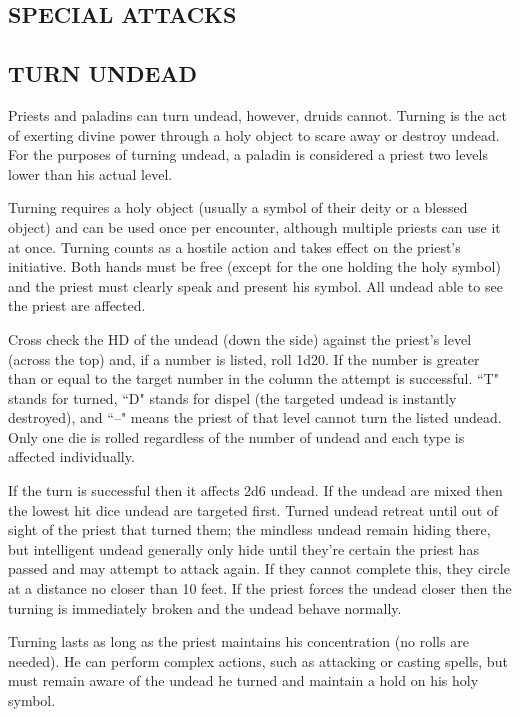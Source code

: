 \begin{multicols}{2}

\section{SPECIAL ATTACKS}

\subsection{TURN UNDEAD}

Priests and paladins can turn undead, however, druids cannot.  Turning is the act of exerting divine power through a holy object to scare away or destroy undead. For the purposes of turning undead, a paladin is considered a priest two levels lower than his actual level.

Turning requires a holy object (usually a symbol of their deity or a blessed object) and can be used once per encounter, although multiple priests can use it at once.  Turning counts as a hostile action and takes effect on the priest's initiative.  Both hands must be free (except for the one holding the holy symbol) and the priest must clearly speak and present his symbol.  All undead able to see the priest are affected. 

Cross check the HD of the undead (down the side) against the priest's level (across the top) and, if a number is listed, roll 1d20.  If the number is greater than or equal to the target number in the column the attempt is successful.  ``T" stands for turned, ``D" stands for dispel (the targeted undead is instantly destroyed), and ``--" means the priest of that level cannot turn the listed undead.  Only one die is rolled regardless of the number of undead and each type is affected individually.

If the turn is successful then it affects 2d6 undead.  If the undead are mixed then the lowest hit dice undead are targeted first.  Turned undead retreat until out of sight of the priest that turned them; the mindless undead remain hiding there, but intelligent undead generally only hide until they're certain the priest has passed and may attempt to attack again.  If they cannot complete this, they circle at a distance no closer than 10 feet.  If the priest forces the undead closer then the turning is immediately broken and the undead behave normally.

Turning lasts as long as the priest maintains his concentration (no rolls are needed).  He can perform complex actions, such as attacking or casting spells, but must remain aware of the undead he turned and maintain a hold on his holy symbol. 


\end{multicols}
